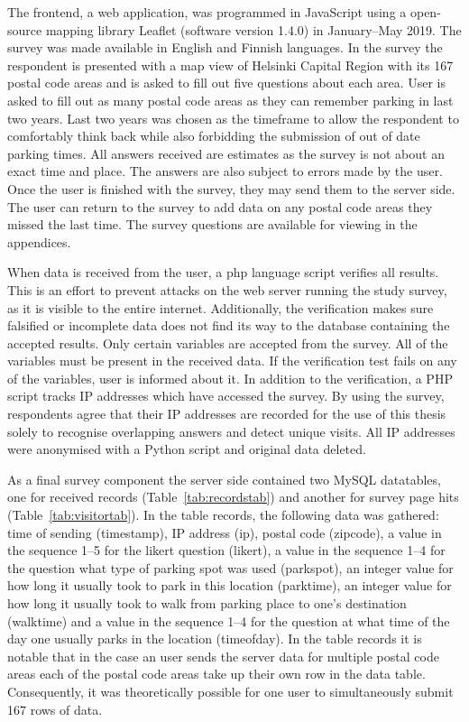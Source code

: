The frontend, a web application, was programmed in JavaScript using a open-source mapping library Leaflet (software version 1.4.0) in January--May 2019. The survey was made available in English and Finnish languages. In the survey the respondent is presented with a map view of Helsinki Capital Region with its 167 postal code areas and is asked to fill out five questions about each area. User is asked to fill out as many postal code areas as they can remember parking in last two years. Last two years was chosen as the timeframe to allow the respondent to comfortably think back while also forbidding the submission of out of date parking times. All answers received are estimates as the survey is not about an exact time and place. The answers are also subject to errors made by the user. Once the user is finished with the survey, they may send them to the server side. The user can return to the survey to add data on any postal code areas they missed the last time. The survey questions are available for viewing in the appendices.

When data is received from the user, a \gls{php} language script verifies all results. This is an effort to prevent attacks on the web server running the study survey, as it is visible to the entire internet. Additionally, the verification makes sure falsified or incomplete data does not find its way to the database containing the accepted results. Only certain variables are accepted from the survey. All of the variables must be present in the received data. If the verification test fails on any of the variables, user is informed about it. In addition to the verification, a PHP script tracks IP addresses which have accessed the survey. By using the survey, respondents agree that their IP addresses are recorded for the use of this thesis solely to recognise overlapping answers and detect unique visits. All IP addresses were anonymised with a Python script and original data deleted.

As a final survey component the server side contained two MySQL datatables, one for received records (Table~\ref{tab:recordstab}) and another for survey page hits (Table~\ref{tab:visitortab}). In the table records, the following data was gathered: time of sending (timestamp), IP address (ip), postal code (zipcode), a value in the sequence 1--5 for the likert question (likert), a value in the sequence 1--4 for the question what type of parking spot was used (parkspot), an integer value for how long it usually took to park in this location (parktime), an integer value for how long it usually took to walk from parking place to one's destination (walktime) and a value in the sequence 1--4 for the question at what time of the day one usually parks in the location (timeofday). In the table records it is notable that in the case an user sends the server data for multiple postal code areas each of the postal code areas take up their own row in the data table. Consequently, it was theoretically possible for one user to simultaneously submit 167 rows of data.

